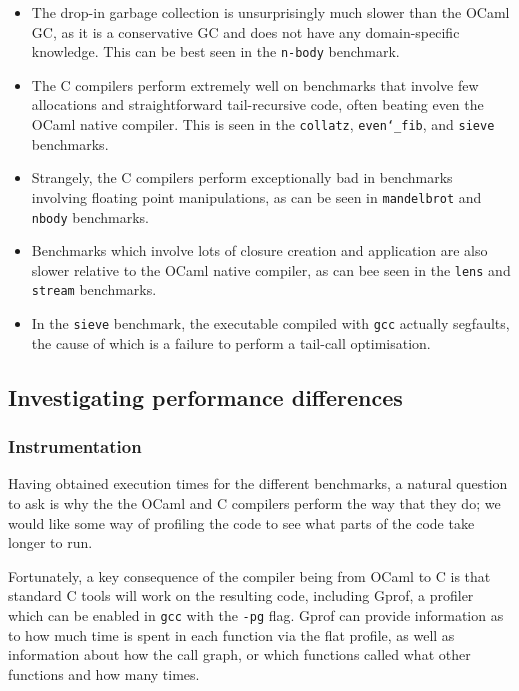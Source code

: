 \documentclass[12pt,a4paper,twoside,openright]{report}
\begin{document}
\begin{itemize}
    \item The drop-in garbage collection is unsurprisingly much slower than the 
    OCaml GC, as it is a conservative GC and does not have any domain-specific 
    knowledge. This can be best seen in the \texttt{n-body} benchmark.
    \item The C compilers perform extremely well on benchmarks that involve few 
    allocations and straightforward tail-recursive code, often beating even the 
    OCaml native compiler. This is seen in the \texttt{collatz}, 
    \texttt{even\char`_fib}, and \texttt{sieve} benchmarks.
    \item Strangely, the C compilers perform exceptionally bad in benchmarks 
    involving floating point manipulations, as can be seen in 
    \texttt{mandelbrot} and \texttt{nbody} benchmarks.
    \item Benchmarks which involve lots of closure creation and application are 
    also slower relative to the OCaml native compiler, as can bee seen in the 
    \texttt{lens} and \texttt{stream} benchmarks.
    \item In the \texttt{sieve} benchmark, the executable compiled with 
    \texttt{gcc} actually segfaults, the cause of which is a failure to perform 
    a tail-call optimisation.
\end{itemize}

\subsection{Investigating performance differences}

\subsubsection{Instrumentation}

Having obtained execution times for the different benchmarks, a natural 
question to ask is why the the OCaml and C compilers perform the way that they 
do; we would like some way of profiling the code to see what parts of the code 
take longer to run.

Fortunately, a key consequence of the compiler being from OCaml to C is that 
standard C tools will work on the resulting code, including Gprof, a profiler 
which can be enabled in \texttt{gcc} with the \texttt{-pg} flag. Gprof can 
provide information as to how much time is spent in each function via the flat 
profile, as well as information about how the call graph, or which functions 
called what other functions and how many times.
\end{document}
